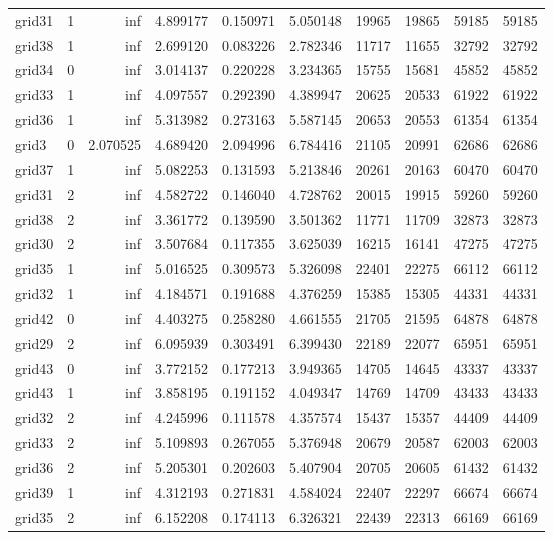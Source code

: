\begin{longtable}{|l|r|r|r|r|r|r|r|r|r|}
grid31 & 1 & inf & 4.899177 & 0.150971 & 5.050148 & 19965 & 19865 & 59185 & 59185 \\
grid38 & 1 & inf & 2.699120 & 0.083226 & 2.782346 & 11717 & 11655 & 32792 & 32792 \\
grid34 & 0 & inf & 3.014137 & 0.220228 & 3.234365 & 15755 & 15681 & 45852 & 45852 \\
grid33 & 1 & inf & 4.097557 & 0.292390 & 4.389947 & 20625 & 20533 & 61922 & 61922 \\
grid36 & 1 & inf & 5.313982 & 0.273163 & 5.587145 & 20653 & 20553 & 61354 & 61354 \\
grid3 & 0 & 2.070525 & 4.689420 & 2.094996 & 6.784416 & 21105 & 20991 & 62686 & 62686 \\
grid37 & 1 & inf & 5.082253 & 0.131593 & 5.213846 & 20261 & 20163 & 60470 & 60470 \\
grid31 & 2 & inf & 4.582722 & 0.146040 & 4.728762 & 20015 & 19915 & 59260 & 59260 \\
grid38 & 2 & inf & 3.361772 & 0.139590 & 3.501362 & 11771 & 11709 & 32873 & 32873 \\
grid30 & 2 & inf & 3.507684 & 0.117355 & 3.625039 & 16215 & 16141 & 47275 & 47275 \\
grid35 & 1 & inf & 5.016525 & 0.309573 & 5.326098 & 22401 & 22275 & 66112 & 66112 \\
grid32 & 1 & inf & 4.184571 & 0.191688 & 4.376259 & 15385 & 15305 & 44331 & 44331 \\
grid42 & 0 & inf & 4.403275 & 0.258280 & 4.661555 & 21705 & 21595 & 64878 & 64878 \\
grid29 & 2 & inf & 6.095939 & 0.303491 & 6.399430 & 22189 & 22077 & 65951 & 65951 \\
grid43 & 0 & inf & 3.772152 & 0.177213 & 3.949365 & 14705 & 14645 & 43337 & 43337 \\
grid43 & 1 & inf & 3.858195 & 0.191152 & 4.049347 & 14769 & 14709 & 43433 & 43433 \\
grid32 & 2 & inf & 4.245996 & 0.111578 & 4.357574 & 15437 & 15357 & 44409 & 44409 \\
grid33 & 2 & inf & 5.109893 & 0.267055 & 5.376948 & 20679 & 20587 & 62003 & 62003 \\
grid36 & 2 & inf & 5.205301 & 0.202603 & 5.407904 & 20705 & 20605 & 61432 & 61432 \\
grid39 & 1 & inf & 4.312193 & 0.271831 & 4.584024 & 22407 & 22297 & 66674 & 66674 \\
grid35 & 2 & inf & 6.152208 & 0.174113 & 6.326321 & 22439 & 22313 & 66169 & 66169 \\

\end{longtable}
